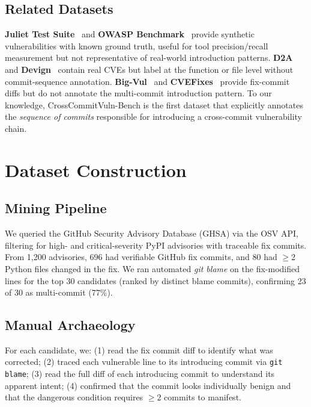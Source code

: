 \documentclass[sigconf,review]{acmart}
\begin{document}
\subsection{Related Datasets}

\textbf{Juliet Test Suite}~\cite{juliet} and \textbf{OWASP Benchmark}~\cite{owasp_bench}
provide synthetic vulnerabilities with known ground truth, useful for tool precision/recall
measurement but not representative of real-world introduction patterns.
\textbf{D2A}~\cite{d2a} and \textbf{Devign}~\cite{devign} contain real CVEs but label at the
function or file level without commit-sequence annotation.
\textbf{Big-Vul}~\cite{bigvul} and \textbf{CVEFixes}~\cite{cvefixes} provide fix-commit diffs
but do not annotate the multi-commit introduction pattern.
To our knowledge, CrossCommitVuln-Bench is the first dataset that explicitly annotates the
\emph{sequence of commits} responsible for introducing a cross-commit vulnerability chain.

\section{Dataset Construction}

\subsection{Mining Pipeline}

We queried the GitHub Security Advisory Database (GHSA) via the OSV API, filtering for
high- and critical-severity PyPI advisories with traceable fix commits. From 1,200 advisories,
696 had verifiable GitHub fix commits, and 80 had $\geq$2 Python files changed in the fix.
We ran automated \emph{git blame} on the fix-modified lines for the top 30 candidates
(ranked by distinct blame commits), confirming 23 of 30 as multi-commit (77\%).

\subsection{Manual Archaeology}

For each candidate, we:
(1) read the fix commit diff to identify what was corrected;
(2) traced each vulnerable line to its introducing commit via \texttt{git blame};
(3) read the full diff of each introducing commit to understand its apparent intent;
(4) confirmed that the commit looks individually benign and that the dangerous condition
    requires $\geq$2 commits to manifest.
\end{document}

